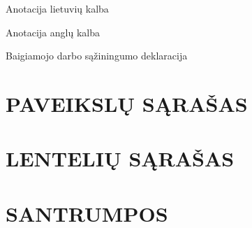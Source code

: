 \documentclass[12pt]{article}
\begin{document}
\begin{titlepage}
\centering

    {\Large Anotacija lietuvių kalba}

\end{titlepage}
\newpage


\begin{titlepage}
\centering

    {\Large Anotacija anglų kalba}

\end{titlepage}
\newpage


\begin{titlepage}
\centering

    {\Large Baigiamojo darbo sąžiningumo deklaracija}

\end{titlepage}
\newpage


    \tableofcontents

\newpage


\section*{PAVEIKSLŲ SĄRAŠAS}


\newpage


\section*{LENTELIŲ SĄRAŠAS}


\newpage


\section*{SANTRUMPOS}


\newpage

\end{document}
